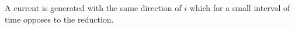 A current is generated with the same direction of $i$  %
which for a small interval of time opposes
to the reduction. %